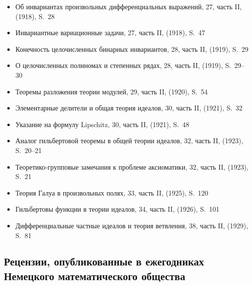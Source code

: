 \documentclass[11pt]{article}
\begin{document}
\begin{itemize}[leftmargin=1.5em,itemsep=0.2em]
\item Об инвариантах произвольных дифференциальных выражений, 27, часть II, (1918), S.~28
\item Инвариантные вариационные задачи, 27, часть II, (1918), S.~47
\item Конечность целочисленных бинарных инвариантов, 28, часть II, (1919), S.~29
\item О целочисленных полиномах и степенных рядах, 28, часть II, (1919), S.~29--30
\item Теоремы разложения теории модулей, 29, часть II, (1920), S.~54
\item Элементарные делители и общая теория идеалов, 30, часть II, (1921), S.~32
\item Указание на формулу Lipschitz, 30, часть II, (1921), S.~48
\item Аналог гильбертовой теоремы в общей теории идеалов, 32, часть II, (1923), S.~20--21
\item Теоретико-групповые замечания к проблеме аксиоматики, 32, часть II, (1923), S.~21
\item Теория Галуа в произвольных полях, 33, часть II, (1925), S.~120
\item Гильбертовы функции в теории идеалов, 34, часть II, (1926), S.~101
\item Дифференциальные частные идеалов и теория ветвления, 38, часть II, (1929), S.~81
\end{itemize}

\subsection*{Рецензии, опубликованные в ежегодниках Немецкого математического общества}
\end{document}
